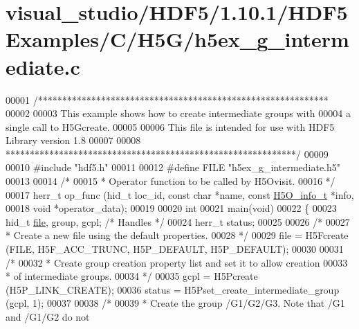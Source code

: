 \hypertarget{visual__studio_2_h_d_f5_21_810_81_2_h_d_f5_examples_2_c_2_h5_g_2h5ex__g__intermediate_8c_source}{}\section{visual\+\_\+studio/\+H\+D\+F5/1.10.1/\+H\+D\+F5\+Examples/\+C/\+H5\+G/h5ex\+\_\+g\+\_\+intermediate.c}
\label{visual__studio_2_h_d_f5_21_810_81_2_h_d_f5_examples_2_c_2_h5_g_2h5ex__g__intermediate_8c_source}

\begin{DoxyCode}
00001 \textcolor{comment}{/************************************************************}
00002 \textcolor{comment}{}
00003 \textcolor{comment}{  This example shows how to create intermediate groups with}
00004 \textcolor{comment}{  a single call to H5Gcreate.}
00005 \textcolor{comment}{}
00006 \textcolor{comment}{  This file is intended for use with HDF5 Library version 1.8}
00007 \textcolor{comment}{}
00008 \textcolor{comment}{ ************************************************************/}
00009 
00010 \textcolor{preprocessor}{#include "hdf5.h"}
00011 
00012 \textcolor{preprocessor}{#define FILE            "h5ex\_g\_intermediate.h5"}
00013 
00014 \textcolor{comment}{/*}
00015 \textcolor{comment}{ * Operator function to be called by H5Ovisit.}
00016 \textcolor{comment}{ */}
00017 herr\_t op\_func (hid\_t loc\_id, \textcolor{keyword}{const} \textcolor{keywordtype}{char} *name, \textcolor{keyword}{const} \hyperlink{struct_h5_o__info__t}{H5O\_info\_t} *info,
00018             \textcolor{keywordtype}{void} *operator\_data);
00019 
00020 \textcolor{keywordtype}{int}
00021 main(\textcolor{keywordtype}{void})
00022 \{
00023     hid\_t       \hyperlink{structfile}{file}, group, gcpl;      \textcolor{comment}{/* Handles */}
00024     herr\_t      status;
00025 
00026     \textcolor{comment}{/*}
00027 \textcolor{comment}{     * Create a new file using the default properties.}
00028 \textcolor{comment}{     */}
00029     file = H5Fcreate (FILE, H5F\_ACC\_TRUNC, H5P\_DEFAULT, H5P\_DEFAULT);
00030 
00031     \textcolor{comment}{/*}
00032 \textcolor{comment}{     * Create group creation property list and set it to allow creation}
00033 \textcolor{comment}{     * of intermediate groups.}
00034 \textcolor{comment}{     */}
00035     gcpl = H5Pcreate (H5P\_LINK\_CREATE);
00036     status = H5Pset\_create\_intermediate\_group (gcpl, 1);
00037 
00038     \textcolor{comment}{/*}
00039 \textcolor{comment}{     * Create the group /G1/G2/G3.  Note that /G1 and /G1/G2 do not}

\end{DoxyCode}
